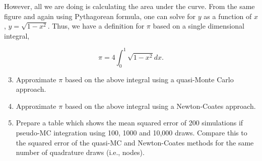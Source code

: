 \documentclass{article}
\begin{document}
However, all we are doing is calculating the area under the curve. From the same figure and again using Pythagorean formula, one can solve for $y$ as a function of $x$, $y = \sqrt{1 - x^2}$. Thus, we have a definition for $\pi$ based on a single dimensional integral, 

$$ \pi = 4 \int_0^1 \sqrt{1 - x^2} dx .$$

\begin{enumerate}
\setcounter{enumi}{2}
\item Approximate $\pi$ based on the above integral using a quasi-Monte Carlo approach. 

\item Approximate $\pi$ based on the above integral using a Newton-Coates approach. 

\item  Prepare a table which shows the mean squared error of 200 simulations if pseudo-MC integration using 100, 1000 and 10,000 draws. Compare this to the squared error of the quasi-MC and Newton-Coates methods for the same number of quadrature draws (i.e., nodes).

\end{enumerate}
\end{document}
